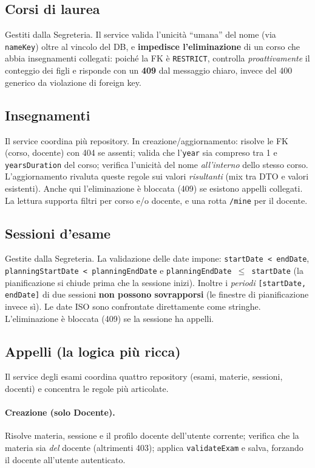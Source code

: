 \documentclass[11pt,a4paper,oneside]{report}
\newcommand{\code}[1]{\texttt{\small #1}}
\begin{document}
\subsection{Corsi di laurea}
Gestiti dalla Segreteria. Il service valida l'unicità ``umana'' del nome (via
\code{nameKey}) oltre al vincolo del DB, e \textbf{impedisce l'eliminazione} di un
corso che abbia insegnamenti collegati: poiché la FK è \code{RESTRICT}, controlla
\emph{proattivamente} il conteggio dei figli e risponde con un \textbf{409} dal
messaggio chiaro, invece del 400 generico da violazione di foreign key.

\subsection{Insegnamenti}
Il service coordina più repository. In creazione/aggiornamento:
risolve le FK (corso, docente) con 404 se assenti; valida che l'\code{year} sia
compreso tra 1 e \code{yearsDuration} del corso; verifica l'unicità del nome
\emph{all'interno} dello stesso corso. L'aggiornamento rivaluta queste regole sui
valori \emph{risultanti} (mix tra DTO e valori esistenti). Anche qui
l'eliminazione è bloccata (409) se esistono appelli collegati. La lettura
supporta filtri per corso e/o docente, e una rotta \code{/mine} per il docente.

\subsection{Sessioni d'esame}
Gestite dalla Segreteria. La validazione delle date impone:
\code{startDate < endDate}, \code{planningStartDate < planningEndDate} e
\code{planningEndDate $\le$ startDate} (la pianificazione si chiude prima che la
sessione inizi). Inoltre i \emph{periodi} \code{[startDate, endDate]} di due
sessioni \textbf{non possono sovrapporsi} (le finestre di pianificazione invece
sì). Le date ISO sono confrontate direttamente come stringhe. L'eliminazione è
bloccata (409) se la sessione ha appelli.

\subsection{Appelli (la logica più ricca)}
\label{sec:exam-rules}
Il service degli esami coordina quattro repository (esami, materie, sessioni,
docenti) e concentra le regole più articolate.

\paragraph{Creazione (solo Docente).} Risolve materia, sessione e il profilo
docente dell'utente corrente; verifica che la materia sia \emph{del} docente
(altrimenti 403); applica \code{validateExam} e salva, forzando il docente
all'utente autenticato.
\end{document}
